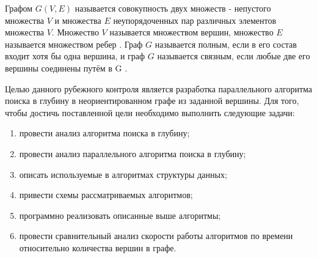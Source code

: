 \Introduction
Графом $G(V, E)$ называется совокупность двух множеств - непустого множества $V$ и множества $E$ неупорядоченных пар различных элементов множества $V$. Множество $V$ называется множеством вершин, множество $E$ называется множеством ребер \cite{but}. Граф $G$ называется полным, если в его состав входит хотя бы одна вершина, и граф $G$ называется связным, если любые две его вершины соединены путём в G \cite{distel}.

Целью данного рубежного контроля является разработка параллельного алгоритма поиска в глубину в неориентированном графе из заданной вершины. Для того, чтобы достичь поставленной цели необходимо выполнить следующие задачи:

\begin{enumerate}
	\item провести анализ алгоритма поиска в глубину;
	\item провести анализ параллельного алгоритма поиска в глубину;
	\item описать используемые в алгоритмах структуры данных;
	\item привести схемы рассматриваемых алгоритмов;
	\item программно реализовать описанные выше алгоритмы;
	\item провести сравнительный анализ скорости работы алгоритмов по времени относительно количества вершин в графе.
\end{enumerate}
